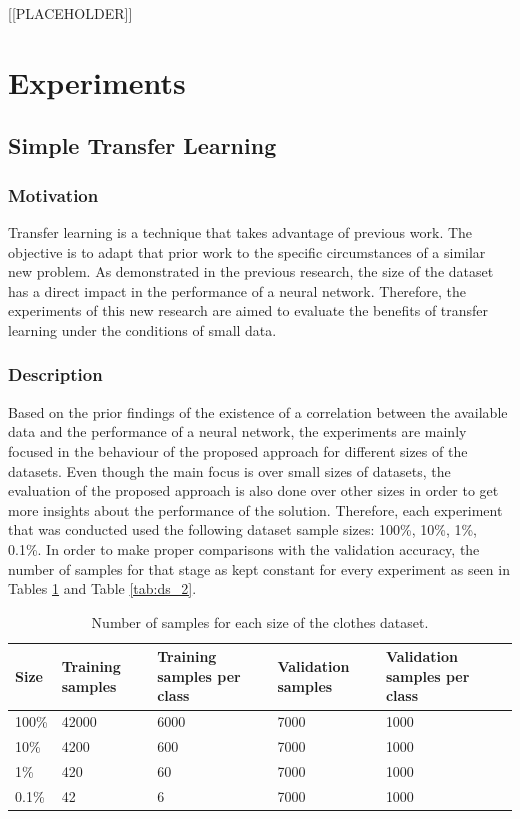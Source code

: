 \documentclass{article}
\begin{document}
[[PLACEHOLDER]]

\section{Experiments}
\label{sec:experiments}

\subsection{Simple Transfer Learning}

\subsubsection{\textbf{Motivation}}

Transfer learning is a technique that takes advantage of previous work. The objective is to adapt that prior work to the specific circumstances of a similar new problem. As demonstrated in the previous research, the size of the dataset has a direct impact in the performance of a neural network. Therefore, the experiments of this new research are aimed to evaluate the benefits of transfer learning under the conditions of small data.

\subsubsection{\textbf{Description}}

Based on the prior findings of the existence of a correlation between the available data and the performance of a neural network, the experiments are mainly focused in the behaviour of the proposed approach for different sizes of the datasets. Even though the main focus is over small sizes of datasets, the evaluation of the proposed approach is also done over other sizes in order to get more insights about the performance of the solution. Therefore, each experiment that was conducted used the following dataset sample sizes: 100\%, 10\%, 1\%, 0.1\%. In order to make proper comparisons with the validation accuracy, the number of samples for that stage as kept constant for every experiment as seen in Tables \ref{tab:ds_1} and Table \ref{tab:ds_2}.

\begin{table}[!htb]
  \centering
  \begin{tabular}{| l | l | l | l | l |}
    \hline
    \textbf{Size} & \textbf{Training samples} & \textbf{Training samples per class} & \textbf{Validation samples} & \textbf{Validation samples per class} \\ \hline
    100\% & 42000 & 6000 & 7000 & 1000 \\ \hline
    10\% & 4200 & 600 & 7000 & 1000 \\ \hline
    1\% & 420  & 60 & 7000 & 1000 \\ \hline
    0.1\% & 42 & 6 & 7000 & 1000 \\ \hline
  \end{tabular}
  \caption{Number of samples for each size of the clothes dataset.}
  \label{tab:ds_1}
\end{table}  
  
\end{document}
